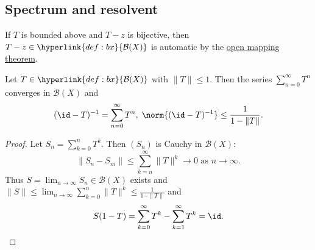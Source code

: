 \documentclass{article}
\begin{document}
\subsection{Spectrum and resolvent}

\begin{remark}
    If $T$ is bounded above and $T-z$ is bijective, then $T-z \in \hyperlink{def:bx}{\mathcal{B}(X)}$ is automatic by the \hyperlink{thm:omt}{open mapping theorem}.
\end{remark}

\begin{fact}
    Let $T \in \hyperlink{def:bx}{\mathcal{B}(X)}$ with $\|T\| \leq 1$.
    Then the series $\sum_{n=0}^\infty T^n$ converges in $\mathcal{B}(X)$ and
    \begin{equation*}
        (\id -T)^{-1} = \sum_{n=0}^\infty T^n, \; \norm{(\id - T)^{-1}} \leq \frac{1}{1 - \|T\|}.
    \end{equation*}
\end{fact}

\begin{proof}
    Let $S_n = \sum_{k=0}^n T^k$. Then $(S_n)$ is Cauchy in $\mathcal{B}(X)$:
    \begin{equation*}
        \|S_n - S_m\| \leq \sum_{k=n}^\infty \|T\|^k \to 0 \text{ as } n \to \infty.
    \end{equation*}
    Thus $S = \lim_{n \to \infty} S_n \in \mathcal{B}(X)$ exists and $\|S\| \leq \lim_{n \to \infty} \sum_{k=0}^n \|T\|^k \leq \frac{1}{1 - \|T\|}$ and
    \begin{equation*}
        S(1-T) = \sum_{k=0}^\infty T^k - \sum_{k=1}^\infty T^k = \id. \qedhere
    \end{equation*}
\end{proof}
\end{document}
